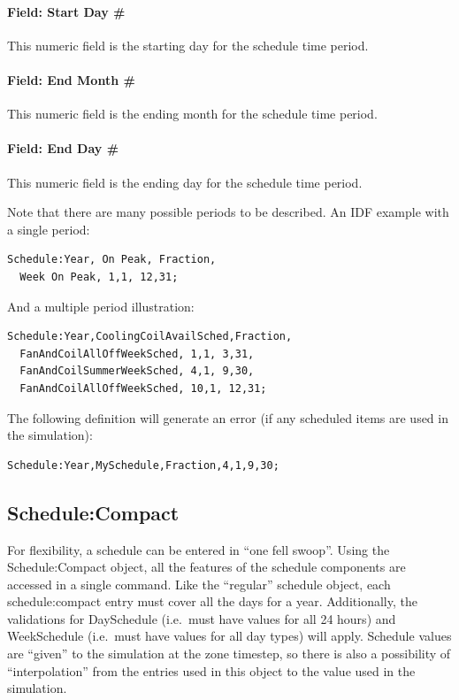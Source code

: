 \paragraph{Field: Start Day \#}\label{field-start-day}

This numeric field is the starting day for the schedule time period.

\paragraph{Field: End Month \#}\label{field-end-month-000}

This numeric field is the ending month for the schedule time period.

\paragraph{Field: End Day \#}\label{field-end-day}

This numeric field is the ending day for the schedule time period.

Note that there are many possible periods to be described. An IDF example with a single period:

\begin{lstlisting}
Schedule:Year, On Peak, Fraction,
  Week On Peak, 1,1, 12,31;
\end{lstlisting}

And a multiple period illustration:

\begin{lstlisting}
Schedule:Year,CoolingCoilAvailSched,Fraction,
  FanAndCoilAllOffWeekSched, 1,1, 3,31,
  FanAndCoilSummerWeekSched, 4,1, 9,30,
  FanAndCoilAllOffWeekSched, 10,1, 12,31;
\end{lstlisting}

The following definition will generate an error (if any scheduled items are used in the simulation):

\begin{lstlisting}
Schedule:Year,MySchedule,Fraction,4,1,9,30;
\end{lstlisting}

\subsection{Schedule:Compact}\label{schedulecompact}

For flexibility, a schedule can be entered in ``one fell swoop''. Using the Schedule:Compact object, all the features of the schedule components are accessed in a single command. Like the ``regular'' schedule object, each schedule:compact entry must cover all the days for a year. Additionally, the validations for DaySchedule (i.e.~must have values for all 24 hours) and WeekSchedule (i.e.~must have values for all day types) will apply. Schedule values are ``given'' to the simulation at the zone timestep, so there is also a possibility of ``interpolation'' from the entries used in this object to the value used in the simulation.

